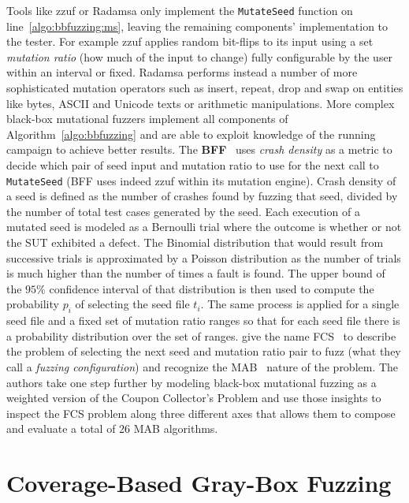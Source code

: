 Tools like zzuf or Radamsa only implement the \texttt{MutateSeed} function on
line~\ref{algo:bbfuzzing:ms}, leaving the remaining components' implementation
to the tester. For example zzuf applies random bit-flips to its input using a
set \emph{mutation ratio} (how much of the input to change) fully configurable
by the user within an interval or fixed. Radamsa performs instead a number of
more sophisticated mutation operators such as insert, repeat, drop and swap on
entities like bytes, ASCII and Unicode texts or arithmetic manipulations. More
complex black-box mutational fuzzers implement all components of
Algorithm~\ref{algo:bbfuzzing} and are able to exploit knowledge of the running
campaign to achieve better results.
The \textbf{\acf{BFF}}~\cite{householder2012probability} uses \emph{crash
density} as a metric to decide which pair of seed input and mutation ratio to
use for the next call to \texttt{MutateSeed} (\ac{BFF} uses indeed zzuf within
its mutation engine). Crash density of a seed is defined as the number of
crashes found by fuzzing that seed, divided by the number of total test cases
generated by the seed. Each execution of a mutated seed is modeled as a
Bernoulli trial where the outcome is whether or not the \ac{SUT} exhibited a
defect. The Binomial distribution that would result from successive trials is
approximated by a Poisson distribution as the number of trials is much higher
than the number of times a fault is found. The upper bound of the $95\%$
confidence interval of that distribution is then used to compute the probability
$p_i$ of selecting the seed file $t_i$. The same process is applied for a single
seed file and a fixed set of mutation ratio ranges so that for each seed file
there is a probability distribution over the set of ranges.
\citeauthor{woo2013scheduling} give the name \ac{FCS}~\cite{woo2013scheduling}
to describe the problem of selecting the next seed and mutation ratio pair to
fuzz (what they call a \emph{fuzzing configuration}) and recognize the
\ac{MAB}~\cite{berry1985bandit} nature of the problem. The authors take one step
further by modeling black-box mutational fuzzing as a weighted version of the
Coupon Collector's Problem and use those insights to inspect the \ac{FCS}
problem along three different axes that allows them to compose and evaluate a
total of 26 \ac{MAB} algorithms.

\section{Coverage-Based Gray-Box Fuzzing}
\label{sec:cgf}

